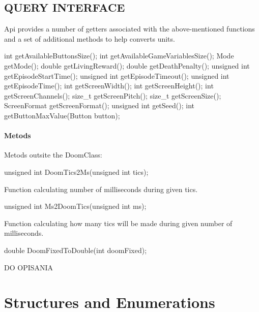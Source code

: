 \vspace{20pt}
\subsection{QUERY INTERFACE}


Api provides a number of getters associated with the above-mentioned functions and a set of additional methods to help converts units.
  

\vspace{20pt}
\begin{clinee}
int getAvailableButtonsSize();
int getAvailableGameVariablesSize();
Mode getMode();
double getLivingReward();
double getDeathPenalty();
unsigned int getEpisodeStartTime();
unsigned int getEpisodeTimeout();
unsigned int getEpisodeTime();
int getScreenWidth();
int getScreenHeight();
int getScreenChannels();
size_t getScreenPitch();
size_t getScreenSize();
ScreenFormat getScreenFormat();
unsigned int getSeed();
int getButtonMaxValue(Button button);
\end{clinee}


\paragraph {Metods} Metods outsite the DoomClass:


\begin{clinee}
unsigned int DoomTics2Ms(unsigned int tics);
\end{clinee}

Function calculating number of milliseconds during given tics.


\vspace{20pt}
\begin{clinee}
unsigned int Ms2DoomTics(unsigned int ms);
\end{clinee}

Function calculating how many tics will be made during given number of milliseconds.


\vspace{20pt}
\begin{clinee}
double DoomFixedToDouble(int doomFixed);
\end{clinee}

DO OPISANIA


\vspace{20pt}
\section{Structures and Enumerations} \label{sec:structs}
